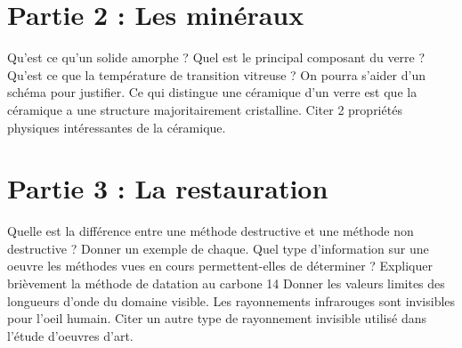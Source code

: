 \documentclass[addpoints]{exam}
\begin{document}
\section{Partie 2 : Les minéraux}

\begin{questions}

\question[2] Qu'est ce qu'un solide amorphe ?
\question[2] Quel est le principal composant du verre ? 
\question[1] Qu'est ce que la température de transition vitreuse ? On pourra s'aider d'un schéma pour justifier. 
\question[1] Ce qui distingue une céramique d'un verre est que la céramique a une structure majoritairement cristalline. Citer 2 propriétés physiques intéressantes de la céramique.

\end{questions}

\section{Partie 3 : La restauration}

\begin{questions}

\question[2] Quelle est la différence entre une méthode destructive et une méthode non destructive ? Donner un exemple de chaque.
\question[2] Quel type d'information sur une oeuvre les méthodes vues en cours permettent-elles de déterminer ?
\question[1] Expliquer brièvement la méthode de datation au carbone 14 
\question[1] Donner les valeurs limites des longueurs d'onde du domaine visible.
\question[1] Les rayonnements infrarouges sont invisibles pour l'oeil humain. Citer un autre type de rayonnement invisible utilisé dans l'étude d'oeuvres d'art.

\end{questions}
\end{document}
